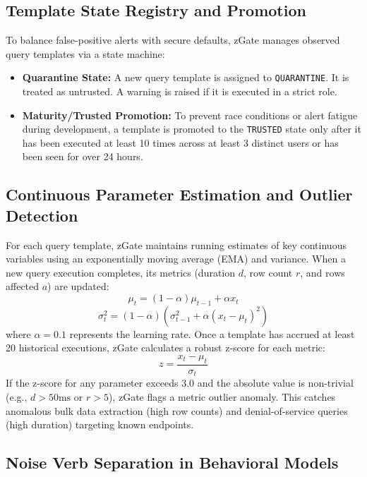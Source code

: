 \subsection{Template State Registry and Promotion}

To balance false-positive alerts with secure defaults, zGate manages observed query templates via a state machine:
\begin{itemize}[leftmargin=*]
    \item \textbf{Quarantine State:} A new query template is assigned to \texttt{QUARANTINE}. It is treated as untrusted. A warning is raised if it is executed in a strict role.
    \item \textbf{Maturity/Trusted Promotion:} To prevent race conditions or alert fatigue during development, a template is promoted to the \texttt{TRUSTED} state only after it has been executed at least 10 times across at least 3 distinct users or has been seen for over 24 hours.
\end{itemize}

\subsection{Continuous Parameter Estimation and Outlier Detection}

For each query template, zGate maintains running estimates of key continuous variables using an exponentially moving average (EMA) and variance. When a new query execution completes, its metrics (duration $d$, row count $r$, and rows affected $a$) are updated:
\[
\mu_t = (1 - \alpha)\mu_{t-1} + \alpha x_t
\]
\[
\sigma^2_t = (1 - \alpha)(\sigma^2_{t-1} + \alpha(x_t - \mu_t)^2)
\]
where $\alpha = 0.1$ represents the learning rate. Once a template has accrued at least 20 historical executions, zGate calculates a robust z-score for each metric:
\[
z = \frac{x_t - \mu_t}{\sigma_t}
\]
If the z-score for any parameter exceeds $3.0$ and the absolute value is non-trivial (e.g., $d > 50\text{ms}$ or $r > 5$), zGate flags a metric outlier anomaly. This catches anomalous bulk data extraction (high row counts) and denial-of-service queries (high duration) targeting known endpoints.

\subsection{Noise Verb Separation in Behavioral Models}

